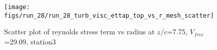 \begin{figure}[H]
\centering
\texttt{[image: figs/run\_28/run\_28\_turb\_visc\_ettap\_top\_vs\_r\_mesh\_scatter]}
\caption{Scatter plot of reynolds stress term vs radius at $z/c$=7.75, $V_{free}$=29.09, station3}
\label{fig:run_28_turb_visc_ettap_top_vs_r_mesh_scatter}
\end{figure}


